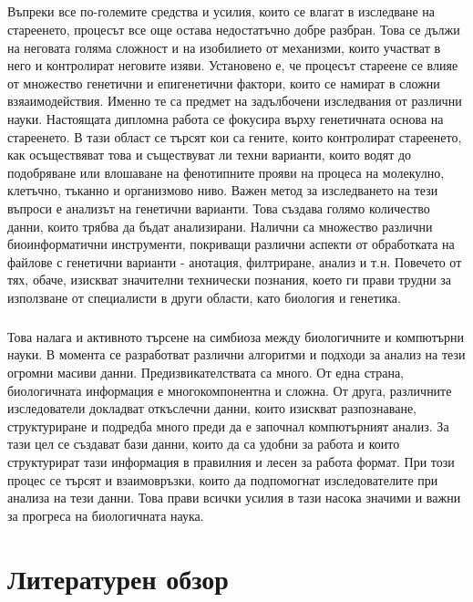 \documentclass[pdftex,cyrillic,14pt,a4page,twoside,openright]{extreport}
\begin{document}
\paragraph{}
Въпреки все по-големите средства и усилия, които се влагат в изследване на стареенето, процесът все още остава недостатъчно добре разбран. Това се дължи на неговата голяма сложност и на изобилието от механизми, които участват в него и контролират неговите изяви. Установено е, че процесът стареене се влияе от множество генетични и епигенетични фактори, които се намират в сложни взяаимодействия. Именно те са предмет на задълбочени изследвания от различни науки.
Настоящата дипломна работа се фокусира върху генетичната основа на стареенето. В тази област се търсят кои са гените, които контролират стареенето, как осъществяват това и съществуват ли техни варианти, които водят до подобряване или влошаване на фенотипните прояви на процеса на молекулно, клетъчно, тъканно и организмово ниво. Важен метод за изследването на тези въпроси е анализът на генетични варианти. Това създава голямо количество данни, които трябва да бъдат анализирани. Налични са множество различни биоинформатични инструменти, покриващи различни аспекти от обработката на файлове с генетични варианти - анотация, филтриране, анализ и т.н. Повечето от тях, обаче, изискват значителни технически познания, което ги прави трудни за използване от специалисти в други области, като биология и генетика.

\paragraph{}
Това налага и  активното търсене на симбиоза между биологичните и компютърни науки. В момента се разработват различни алгоритми и подходи за анализ на тези огромни масиви данни. Предизвикателствата са много. От една страна, биологичната информация е многокомпонентна и сложна. От друга, различните изследователи  докладват откъслечни данни, които изискват разпознаване, структуриране и  подредба много преди да е започнал компютърният анализ. За тази цел се създават бази данни, които да са удобни за работа и които структурират тази информация в правилния и лесен за работа формат. При този процес се търсят и взаимовръзки, които да подпомогнат изследователите при анализа на тези данни. Това прави всички усилия в тази насока значими и важни за прогреса на биологичната наука.
            
\chapter{Литературен обзор}
\end{document}
